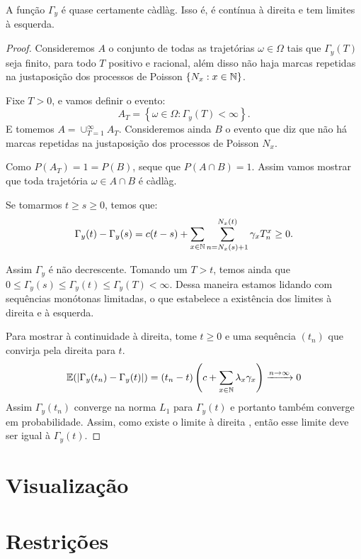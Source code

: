 \begin{proposicao}
  \label{prop:gamma-cadlag}
  A função $\Gamma_y$ é quase certamente càdlàg. Isso é, é contínua à
  direita e tem limites à esquerda.
\end{proposicao}
\begin{proof}

  Consideremos $A$ o conjunto de todas as trajetórias $\omega \in
  \Omega$ tais que $\Gamma_y(T)$ seja finito, para todo $T$ positivo e
  racional, além disso não haja marcas repetidas na justaposição dos
  processos de Poisson $\{N_x: x \in {\mathbb{N}}\}$.


 Fixe $T > 0$, e vamos definir o evento:
  \begin{displaymath}
    A_T = \left\{
      \omega \in \Omega: \Gamma_y(T) < \infty
    \right\}.
  \end{displaymath}
  E tomemos $A = \cup_{T=1}^{\infty} A_T$. Consideremos ainda $B$ o
  evento que diz que não há marcas repetidas na justaposição dos
  processos de Poisson $N_x$.

  Como $P(A_T) = 1 = P(B)$, seque que $P(A \cap B) = 1$. Assim vamos
  mostrar que toda trajetória $\omega \in A \cap B$ é càdlàg.

  Se tomarmos $t \geq s \geq 0$, temos que:
  \begin{equation*}
    \Gamma_y(t) - \Gamma_y(s) = 
    c (t - s) + 
    \sum_{x \in {\mathbb{N}}} \sum_{n = N_x(s)+1}^{N_x(t)} \gamma_x T^x_n
    \geq 0 .
  \end{equation*}


  Assim $\Gamma_y$ é não decrescente. Tomando um $T > t$, temos ainda
  que $0 \leq \Gamma_y(s) \leq \Gamma_y(t) \leq \Gamma_y(T) <
  \infty$. Dessa maneira estamos lidando com sequências monótonas
  limitadas, o que estabelece a existência dos limites à direita e à
  esquerda.



  Para mostrar à continuidade à direita, tome $t \geq 0$ e uma
  sequência $(t_n)$ que convirja pela direita para $t$.
  \begin{equation*}
    {\mathbb{E}}(|\Gamma_y(t_n) - \Gamma_y(t)|) =
    (t_n - t) \left(
      c + 
      \sum_{x \in {\mathbb{N}}}\lambda_x \gamma_x 
    \right) \xrightarrow{n \to \infty} 0 
  \end{equation*}
  Assim $\Gamma_y(t_n)$ converge na norma $L_1$ para $\Gamma_y(t)$ e
  portanto também converge em probabilidade. Assim, como existe o
  limite à direita \qc, então esse limite deve ser igual à
  $\Gamma_y(t)$.


\end{proof}


\section{Visualização}



\section{Restrições}



